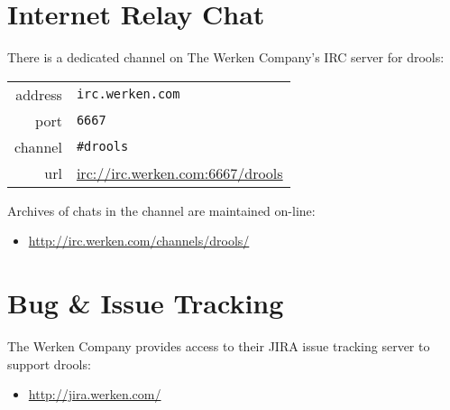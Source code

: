 \section{Internet Relay Chat}

There is a dedicated channel on The Werken Company's IRC server for
drools:\\

\begin{tabular}{rl}
address & \verb|irc.werken.com| \\
port    & \verb|6667| \\
channel & \verb|#drools|\\
url     & \url{irc://irc.werken.com:6667/drools}\\
\end{tabular}

\bigskip

Archives of chats in the channel are maintained on-line:

\begin{itemize}
    \item \url{http://irc.werken.com/channels/drools/}
\end{itemize}

\section{Bug \& Issue Tracking}

The Werken Company provides access to their JIRA issue tracking server
to support drools:

\begin{itemize}
    \item \url{http://jira.werken.com/}
\end{itemize}
